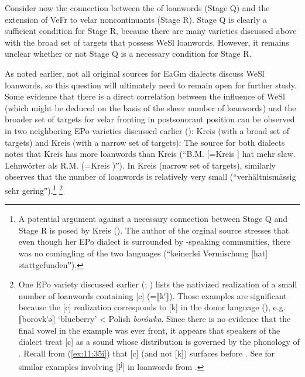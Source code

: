 Consider now the connection between the  of loanwords (Stage Q) and the extension of VeFr to velar noncontinuants (Stage R). Stage Q is clearly a sufficient condition for Stage R, because there are many varieties discussed above with the broad set of targets that possess WeSl loanwords. However, it remains unclear whether or not Stage Q is a necessary condition for Stage R.

As noted earlier, not all original sources for EaGm dialects discuss WeSl loanwords, so this question will ultimately need to remain open for further study. Some evidence that there is a direct correlation between the influence of WeSl (which might be deduced on the basis of the sheer number of  loanwords) and the broader set of targets for velar fronting in postsonorant position can be observed in two neighboring EPo varieties discussed earlier (): Kreis  (with a broad set of targets) and Kreis  (with a narrow set of targets): The source for both dialects \citep[73]{Mischke1936} notes that Kreis  has more  loanwords than Kreis  (“B.M. [=Kreis ] hat mehr slaw. Lehnwörter als R.M. (=Kreis )ˮ). In Kreis  (narrow set of targets), \citet[83]{Mahnke1931} similarly observes that the number of  loanwords is relatively very small (“verhältnismässig sehr geringˮ).\footnote{{A potential argument against a necessary connection between Stage Q and Stage R is posed by Kreis  (). The author of the orginal source \citep[144]{Semrau1915a} stresses that even though her EPo dialect is surrounded by -speaking communities, there was no comingling of the two languages (“keinerlei Vermischung [hat] stattgefundenˮ).}} \footnote{{One EPo variety discussed earlier (; \citealt{Pirk1928}) lists the nativized realization of a small number of  loanwords containing [c] (=⟦kʹ⟧). Those examples are significant because the [c] realization corresponds to [k] in the donor language (), e.g. ⟦borōvkʹə⟧ ‘blueberry’ < Polish} \textrm{\textit{borówka}}\textrm{. Since there is no evidence that the final vowel in the  example was ever front, it appears that speakers of the  dialect treat [c] as a sound whose distribution is governed by the phonology of . Recall from (\ref{ex:11:35i}) that [c] (and not [k]) surfaces before . See \citet[157]{Jacobs1996} for similar examples involving [l}\textrm{\textsuperscript{j}}\textrm{] in  loanwords from .}}

